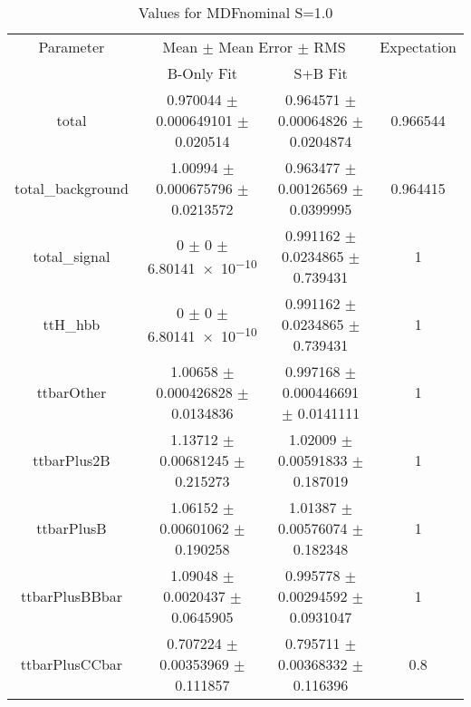 \begin{table}
\centering
\caption{Values for MDFnominal S=1.0}
\begin{tabular}{cccc}
\toprule
Parameter & \multicolumn{2}{c}{Mean $\pm$ Mean Error $\pm$ RMS} & Expectation\\
 & B-Only Fit & S+B Fit & \\
\midrule
total & \num{0.970044} $\pm$ \num{0.000649101} $\pm$ \num{0.020514} & \num{0.964571} $\pm$ \num{0.00064826} $\pm$ \num{0.0204874} & \num{0.966544}\\
total\_background & \num{1.00994} $\pm$ \num{0.000675796} $\pm$ \num{0.0213572} & \num{0.963477} $\pm$ \num{0.00126569} $\pm$ \num{0.0399995} & \num{0.964415}\\
total\_signal & \num{0} $\pm$ \num{0} $\pm$ \num{6.80141e-10} & \num{0.991162} $\pm$ \num{0.0234865} $\pm$ \num{0.739431} & \num{1}\\
ttH\_hbb & \num{0} $\pm$ \num{0} $\pm$ \num{6.80141e-10} & \num{0.991162} $\pm$ \num{0.0234865} $\pm$ \num{0.739431} & \num{1}\\
ttbarOther & \num{1.00658} $\pm$ \num{0.000426828} $\pm$ \num{0.0134836} & \num{0.997168} $\pm$ \num{0.000446691} $\pm$ \num{0.0141111} & \num{1}\\
ttbarPlus2B & \num{1.13712} $\pm$ \num{0.00681245} $\pm$ \num{0.215273} & \num{1.02009} $\pm$ \num{0.00591833} $\pm$ \num{0.187019} & \num{1}\\
ttbarPlusB & \num{1.06152} $\pm$ \num{0.00601062} $\pm$ \num{0.190258} & \num{1.01387} $\pm$ \num{0.00576074} $\pm$ \num{0.182348} & \num{1}\\
ttbarPlusBBbar & \num{1.09048} $\pm$ \num{0.0020437} $\pm$ \num{0.0645905} & \num{0.995778} $\pm$ \num{0.00294592} $\pm$ \num{0.0931047} & \num{1}\\
ttbarPlusCCbar & \num{0.707224} $\pm$ \num{0.00353969} $\pm$ \num{0.111857} & \num{0.795711} $\pm$ \num{0.00368332} $\pm$ \num{0.116396} & \num{0.8}\\
\bottomrule
\end{tabular}
\end{table}